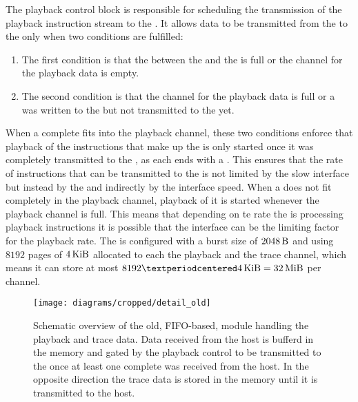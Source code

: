 The playback control block is responsible for scheduling the transmission of the playback instruction stream to the \pbexec{}.
It allows data to be transmitted from the \VFIFO{} to the \pbexec{} only when two conditions are fulfilled:
\begin{enumerate}
\item The first condition is that the \FIFO{} between the \VFIFO{} and the \pbexec{} is full or the \VFIFO{} channel for the playback data is empty.
\item The second condition is that the \VFIFO{} channel for the playback data is full or a \haltInstr{} was written to the \VFIFO{} but not transmitted to the \pbexec{} yet.
\end{enumerate}
When a complete \PlaybackProgram{} fits into the \VFIFO{} playback channel, these two conditions enforce that playback of the instructions that make up the \PlaybackProgram{} is only started once it was completely transmitted to the \VFIFO{}, as each \PlaybackProgram{} ends with a \haltInstr{}. This ensures that the rate of instructions that can be transmitted to the \pbexec{} is not limited by the slow \HostARQ{} interface but instead by the \VFIFO{} and indirectly by the \XilinxMIG{} interface speed.
When a \PlaybackProgram{} does not fit completely in the \VFIFO{} playback channel, playback of it is started whenever the \VFIFO{} playback channel is full. This means that depending on te rate the \pbexec{} is processing playback instructions it is possible that the \HostARQ{} interface can be the limiting factor for the playback rate.
The \VFIFO{} is configured with a burst size of \(\SI{2048}{\byte}\) and using $\num{8192}$ pages of $\SI{4}{\kibi\byte}$ allocated to each the playback and the trace channel, which means it can store at most \(\num{8192} · \SI{4}{\kibi\byte} = \SI{32}{\mebi\byte}\) per channel.

\begin{figure}
\centerline{\texttt{[image: diagrams/cropped/detail\_old]}}
\caption{Schematic overview of the old, FIFO{}-based, module handling the playback and trace data. Data received from the host is bufferd in the \DDR{} memory and gated by the playback control to be transmitted to the \pbexec{} once at least one complete \PlaybackProgram{} was received from the host. In the opposite direction the trace data is stored in the \DDR{} memory until it is transmitted to the host.}\label{diagram:detail_old}
\end{figure}


